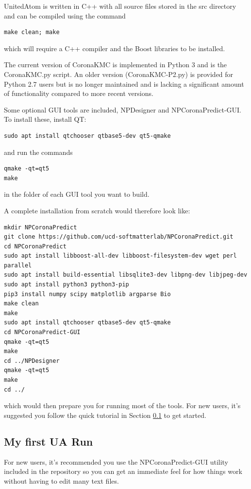 \documentclass[10pt,a4paper,onecolumn]{report}
\begin{document}
UnitedAtom is written in C++ with all source files stored in the src directory and can be compiled using the command
\begin{lstlisting}
make clean; make
\end{lstlisting}
which will require a C++ compiler and the Boost libraries to be installed.

The current version of CoronaKMC is implemented in Python 3 and is the CoronaKMC.py script. An older version (CoronaKMC-P2.py) is provided for Python 2.7 users but is no longer maintained and is lacking a significant amount of functionality compared to more recent versions. 
 
Some optional GUI tools are included, NPDesigner and NPCoronaPredict-GUI. To install these, install QT:
\begin{lstlisting}
sudo apt install qtchooser qtbase5-dev qt5-qmake 
\end{lstlisting} 

and run the commands

\begin{lstlisting}
qmake -qt=qt5
make
\end{lstlisting} 
in the folder of each GUI tool you want to build. 

A complete installation from scratch would therefore look like:

\begin{lstlisting}
mkdir NPCoronaPredict
git clone https://github.com/ucd-softmatterlab/NPCoronaPredict.git
cd NPCoronaPredict
sudo apt install libboost-all-dev libboost-filesystem-dev wget perl parallel  
sudo apt install build-essential libsqlite3-dev libpng-dev libjpeg-dev
sudo apt install python3 python3-pip
pip3 install numpy scipy matplotlib argparse Bio
make clean
make
sudo apt install qtchooser qtbase5-dev qt5-qmake 
cd NPCoronaPredict-GUI
qmake -qt=qt5
make
cd ../NPDesigner
qmake -qt=qt5
make
cd ../
\end{lstlisting}

 which would then prepare you for running most of the tools. For new users, it's suggested you follow the quick tutorial in Section \ref{section:myFirstRun} to get started.


\subsection{My first UA Run} \label{section:myFirstRun}
For new users, it's recommended you use the NPCoronaPredict-GUI utility included in the repository so you can get an immediate feel for how things work without having to edit many text files. 
\end{document}

